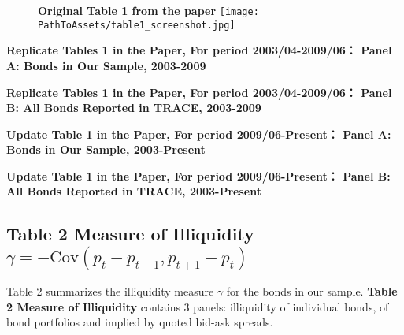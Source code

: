 \documentclass{article}
\newcommand*{\PathToAssets}{../assets}%
\newcommand*{\PathToOutput}{../output/}%
\begin{document}
\begin{figure}[hbt!]
\centering
\textbf{\large Original Table 1 from the paper}
\texttt{[image: \\PathToAssets/table1\_screenshot.jpg]}
\end{figure}


\begin{table}[hbt!]
\centering
\textbf{\large Replicate Tables 1 in the Paper, For period 2003/04-2009/06： Panel A: Bonds in Our Sample, 2003-2009}
\resizebox{\textwidth}{!}{%
    
}
\label{table:table1_panelA}
\end{table}


\begin{table}[hbt!]
\centering
\textbf{\large Replicate Tables 1 in the Paper, For period 2003/04-2009/06： Panel B: All Bonds Reported in TRACE, 2003-2009}
\resizebox{\textwidth}{!}{%
    
}
\label{table:table1_panelB}
\end{table}


\begin{table}[hbt!]
\centering
\textbf{\large Update Table 1 in the Paper, For period 2009/06-Present： Panel A: Bonds in Our Sample, 2003-Present}
\resizebox{\textwidth}{!}{%
    
}
\label{table:  table1_panelA_uptodate}
\end{table}


\begin{table}[hbt!]
\centering
\textbf{\large Update Table 1 in the Paper, For period 2009/06-Present： Panel B: All Bonds Reported in TRACE, 2003-Present}
\resizebox{\textwidth}{!}{%
    
}
\label{table:  table1_panelB_uptodate}
\end{table}



\subsection{Table 2 Measure of Illiquidity $ \gamma = -\text{Cov}(p_t - p_{t-1}, p_{t+1} - p_t) $ }


Table 2 summarizes the illiquidity measure $\gamma$ for the bonds in our sample. \textbf{Table 2 Measure of Illiquidity} contains 3 panels: illiquidity of individual bonds, of bond portfolios and implied by quoted bid-ask spreads.
\end{document}
